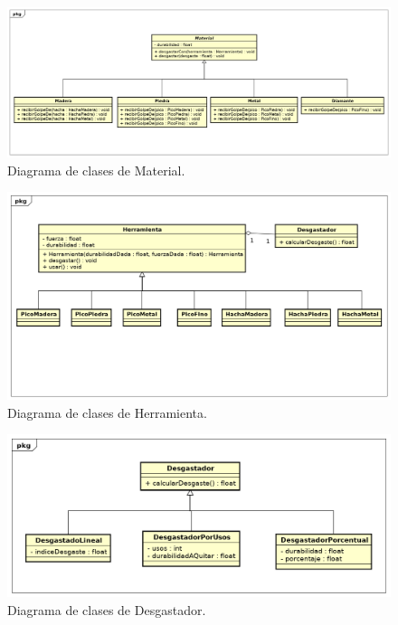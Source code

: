 \documentclass[titlepage,a4paper]{article}
\begin{document}
\begin{figure}[H]
\centering
\includegraphics[width=\textwidth]{Diagramas/Materiales.png}
\caption{\label{fig:material}Diagrama de clases de Material.}
\end{figure}

\begin{figure}[H]
\centering
\includegraphics[width=\textwidth]{Diagramas/Herramienta.png}
\caption{\label{fig:herramienta}Diagrama de clases de Herramienta.}
\end{figure}

\begin{figure}[H]
\centering
\includegraphics[width=\textwidth]{Diagramas/Desgastador.png}
\caption{\label{fig:desgastador}Diagrama de clases de Desgastador.}
\end{figure}
\end{document}
